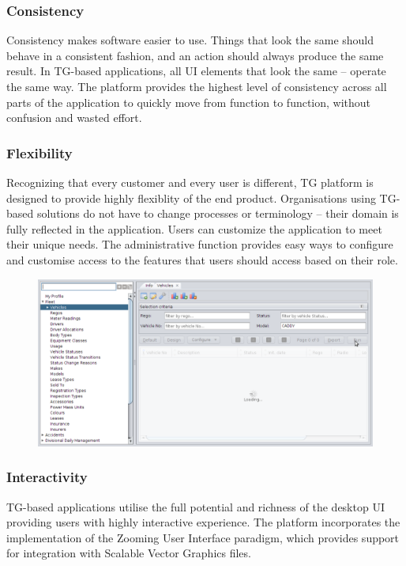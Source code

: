 \documentclass[a4paper,10pt,twocolumn]{article}
\begin{document}
\subsubsection*{Consistency}

  Consistency makes software easier to use. 
  Things that look the same should behave in a consistent fashion, and an action should always produce the same result. 
  In TG-based applications, all UI elements that look the same -- operate the same way. 
  The platform provides the highest level of consistency across all parts of the application to quickly move from function to function, without confusion and wasted effort.
 
\subsubsection*{Flexibility}
  Recognizing that every customer and every user is different, TG platform is designed to provide highly flexiblity of the end product. 
  Organisations using TG-based solutions do not have to change processes or terminology -- their domain is fully reflected in the application. 
  Users can customize the application to meet their unique needs.
  The administrative function provides easy ways to configure and customise access to the features that users should access based on their role.

  \begin{figure}[!h]
  \centering
  \includegraphics[scale=0.2]{images/03-running.png}
  \end{figure}

\subsubsection*{Interactivity}
  TG-based applications utilise the full potential and richness of the desktop UI providing users with highly interactive experience.
  The platform incorporates the implementation of the Zooming User Interface paradigm, which provides support for integration with Scalable Vector Graphics files.
\end{document}
